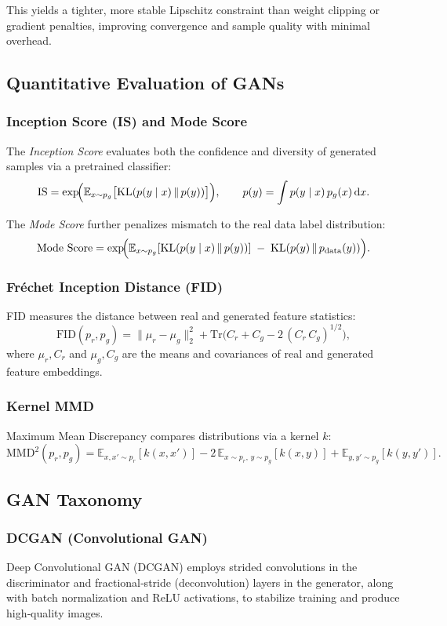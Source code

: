 \documentclass{article}
\begin{document}
This yields a tighter, more stable Lipschitz constraint than weight clipping or gradient penalties, improving convergence and sample quality with minimal overhead.


\subsection{Quantitative Evaluation of GANs}

\subsubsection{Inception Score (IS) and Mode Score}
The \emph{Inception Score} evaluates both the confidence and diversity of generated samples via a pretrained classifier:
\[
\mathrm{IS}
= \exp\!\Bigl(\mathbb{E}_{x\sim p_g}\bigl[\mathrm{KL}(p(y\mid x)\,\|\,p(y))\bigr]\Bigr),
\qquad
p(y)=\int p(y\mid x)\,p_g(x)\,\mathrm{d}x.
\]

The \emph{Mode Score} further penalizes mismatch to the real data label distribution:
\[
\mathrm{Mode\ Score}
= \exp\!\Bigl(\mathbb{E}_{x\sim p_g}[\mathrm{KL}(p(y\mid x)\,\|\,p(y))]
\;-\;\mathrm{KL}(p(y)\,\|\,p_{\mathrm{data}}(y))\Bigr).
\]

\subsubsection{Fréchet Inception Distance (FID)}
FID measures the distance between real and generated feature statistics:
\[
\mathrm{FID}(p_r,p_g)
= \|\mu_r - \mu_g\|_2^2
  + \mathrm{Tr}\bigl(C_r + C_g - 2\,(C_r\,C_g)^{1/2}\bigr),
\]
where \(\mu_r, C_r\) and \(\mu_g, C_g\) are the means and covariances of real and generated feature embeddings.

\subsubsection{Kernel MMD}
Maximum Mean Discrepancy compares distributions via a kernel \(k\):
\[
\mathrm{MMD}^2(p_r,p_g)
= \mathbb{E}_{x,x'\sim p_r}[k(x,x')]
- 2\,\mathbb{E}_{x\sim p_r,\,y\sim p_g}[k(x,y)]
+ \mathbb{E}_{y,y'\sim p_g}[k(y,y')].
\]

\subsection{GAN Taxonomy}

\subsubsection{DCGAN (Convolutional GAN)}
Deep Convolutional GAN (DCGAN) employs strided convolutions in the discriminator and fractional‑stride (deconvolution) layers in the generator, along with batch normalization and ReLU activations, to stabilize training and produce high‑quality images.
\end{document}
